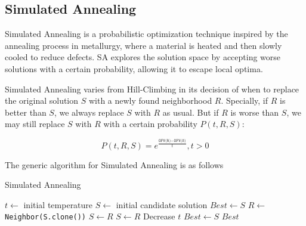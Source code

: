         \subsection{Simulated Annealing}
                Simulated Annealing is a probabilistic optimization technique inspired by the annealing process in metallurgy, where a material is heated and then slowly cooled to reduce defects. SA explores the solution space by accepting worse solutions with a certain probability, allowing it to escape local optima.

                Simulated Annealing varies from Hill-Climbing in its decision of when to replace the original solution $S$ with a newly found neighborhood $R$. Specially, if $R$ is better than $S$, we always replace $S$ with $R$ as usual. But if $R$ is worse than $S$, we may still replace $S$ with $R$ with a certain probability $P(t, R, S)$:

                \begin{equation}
                    P(t, R, S) = e^{\frac{\texttt{OFV(R)} - \texttt{OFV(S)}}{t}}, t > 0
                \end{equation}

                The generic algorithm for Simulated Annealing is as follows

                \begin{algorithm}[!htp]
                    \centering
                    \caption{Simulated Annealing}
                    \begin{algorithmic}[1]
                        \State $t \gets$ initial temperature
                        \State $S \gets$ initial candidate solution
                        \State $Best \gets S$
                            \State $R \gets$ \texttt{Neighbor(S.clone())}
                                \State $S \gets R$
                                \State $S \gets R$
                            \EndIf
                            \State Decrease $t$
                                \State $Best \gets S$
                            \EndIf
                        \EndWhile
                        \State \Return $Best$
                    \end{algorithmic}
                \end{algorithm}

